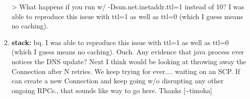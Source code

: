 \documentclass{report}%
\begin{document}
\begin{enumerate}
\newline%
\newline%
\newline%
> What happens if you run w/ {-}Dsun.net.inetaddr.ttl=1 instead of 10?\newline%
\newline%
\newline%
\newline%
I was able to reproduce this issue with ttl=1 as well as ttl=0 (which I guess means no caching).%
\item%
\textbf{stack: }bq. I was able to reproduce this issue with ttl=1 as well as ttl=0 (which I guess means no caching).\newline%
\newline%
\newline%
\newline%
Ouch.\newline%
\newline%
\newline%
\newline%
Any evidence that java process ever notices the DNS update?\newline%
\newline%
\newline%
\newline%
Next I think would be looking at throwing away the Connection after N retries. We keep trying for ever.... waiting on an SCP.  If can create a new Connection and keep going w/o disrupting any other ongoing RPCs., that sounds like way to go here. Thanks {[}\textasciitilde{}timoha{]}%
\end{enumerate}

%
\end{document}
